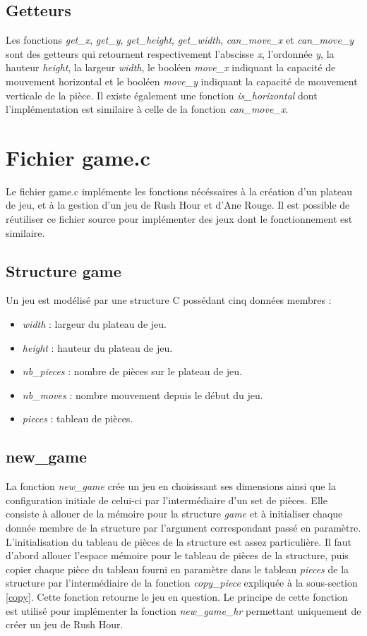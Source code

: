 \documentclass{report}
\begin{document}
\subsection{Getteurs}
Les fonctions \emph{get\_x}, \emph{get\_y}, \emph{get\_height}, \emph{get\_width}, \emph{can\_move\_x} et \emph{can\_move\_y} sont des getteurs qui retournent respectivement l'abscisse \emph{x}, l'ordonnée \emph{y}, la hauteur \emph{height}, la largeur \emph{width}, le booléen \emph{move\_x} indiquant la capacité de mouvement horizontal et le booléen \emph{move\_y} indiquant la capacité de mouvement verticale de la pièce. Il existe également une fonction \emph{is\_horizontal} dont l'implémentation est similaire à celle de la fonction \emph{can\_move\_x}.
\section{Fichier game.c}
Le fichier game.c implémente les fonctions nécéssaires à la création d'un plateau de jeu, et à la gestion d'un jeu de Rush Hour et d'Ane Rouge. Il est possible de réutiliser ce fichier source pour implémenter des jeux dont le fonctionnement est similaire.
\subsection{Structure game}
Un jeu est modélisé par une structure C possédant cinq données membres :
\begin{itemize}
\item \emph{width} : largeur du plateau de jeu.
\item \emph{height} : hauteur du plateau de jeu.
\item \emph{nb\_pieces} : nombre de pièces sur le plateau de jeu.
\item \emph{nb\_moves} : nombre mouvement depuis le début du jeu.
\item \emph{pieces} : tableau de pièces.
\end{itemize}
\subsection{new\_game}
La fonction \emph{new\_game} crée un jeu en choisissant ses dimensions ainsi que la configuration initiale de celui-ci par l'intermédiaire d'un set de pièces. Elle consiste à allouer de la mémoire pour la structure \emph{game} et à initialiser chaque donnée membre de la structure par l'argument correspondant passé en paramètre. L'initialisation du tableau de pièces de la structure est assez particulière. Il faut d'abord allouer l'espace mémoire pour le tableau de pièces de la structure, puis copier chaque pièce du tableau fourni en paramètre dans le tableau \emph{pieces} de la structure par l'intermédiaire de la fonction \emph{copy\_piece} expliquée à la sous-section \ref{copy}. Cette fonction retourne le jeu en question. Le principe de cette fonction est utilisé pour implémenter la fonction \emph{new\_game\_hr} permettant uniquement de créer un jeu de Rush Hour.
\end{document}
